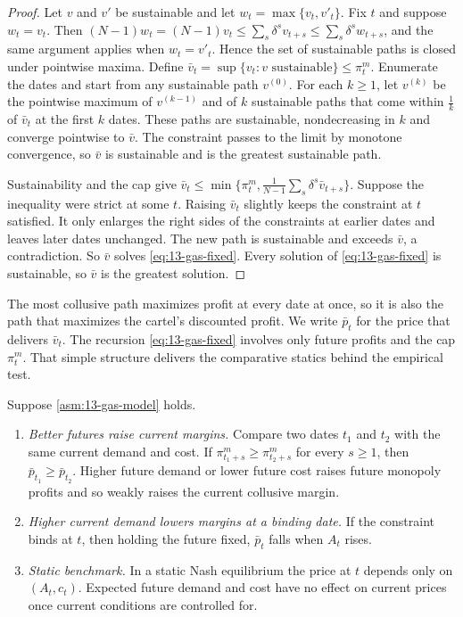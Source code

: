 \begin{proof}
Let $v$ and $v'$ be sustainable and let $w_t=\max\{v_t,v'_t\}$. Fix $t$ and suppose $w_t=v_t$. Then
$(N-1)w_t=(N-1)v_t\le\sum_s\delta^s v_{t+s}\le\sum_s\delta^s w_{t+s}$, and the same argument applies when
$w_t=v'_t$. Hence the set of sustainable paths is closed under pointwise maxima. Define
$\bar v_t=\sup\{v_t: v\text{ sustainable}\}\le\pi^m_t$. Enumerate the dates and start from any sustainable path
$v^{(0)}$. For each $k\ge1$, let $v^{(k)}$ be the pointwise maximum of $v^{(k-1)}$ and of $k$ sustainable
paths that come within $\frac{1}{k}$ of $\bar v_t$ at the first $k$ dates. These paths are sustainable,
nondecreasing in $k$ and converge pointwise to $\bar v$. The constraint
passes to the limit by monotone convergence, so $\bar v$ is sustainable and is the greatest sustainable path.

Sustainability and the cap give $\bar v_t\le\min\{\pi^m_t,\frac{1}{N-1}\sum_s\delta^s\bar v_{t+s}\}$.
Suppose the inequality were strict at some $t$. Raising $\bar v_t$ slightly keeps the constraint at $t$
satisfied. It only enlarges the right sides of the constraints at earlier dates and leaves later dates
unchanged. The new path is sustainable and exceeds $\bar v$, a contradiction. So $\bar v$ solves
\eqref{eq:13-gas-fixed}. Every solution of \eqref{eq:13-gas-fixed} is sustainable, so $\bar v$ is the
greatest solution.
\end{proof}

The most collusive path maximizes profit at every date at once, so it is also the path that maximizes the
cartel's discounted profit. We write $\bar p_t$ for the price that delivers $\bar v_t$. The recursion
\eqref{eq:13-gas-fixed} involves only future profits and the cap $\pi^m_t$. That simple structure delivers
the comparative statics behind the empirical test.

\begin{proposition}\label{prop:13-gas-cs}
Suppose \cref{asm:13-gas-model} holds.
\begin{enumerate}[label=(\alph*)]
\item \emph{Better futures raise current margins.} Compare two dates $t_1$ and $t_2$ with the same current
demand and cost. If $\pi^m_{t_1+s}\ge\pi^m_{t_2+s}$ for every $s\ge1$, then $\bar p_{t_1}\ge\bar p_{t_2}$.
Higher future demand or lower future cost raises future monopoly profits and so weakly raises the current
collusive margin.
\item \emph{Higher current demand lowers margins at a binding date.} If the constraint binds at $t$, then
holding the future fixed, $\bar p_t$ falls when $A_t$ rises.
\item \emph{Static benchmark.} In a static Nash equilibrium the price at $t$ depends only on $(A_t,c_t)$.
Expected future demand and cost have no effect on current prices once current conditions are controlled
for.
\end{enumerate}
\end{proposition}

